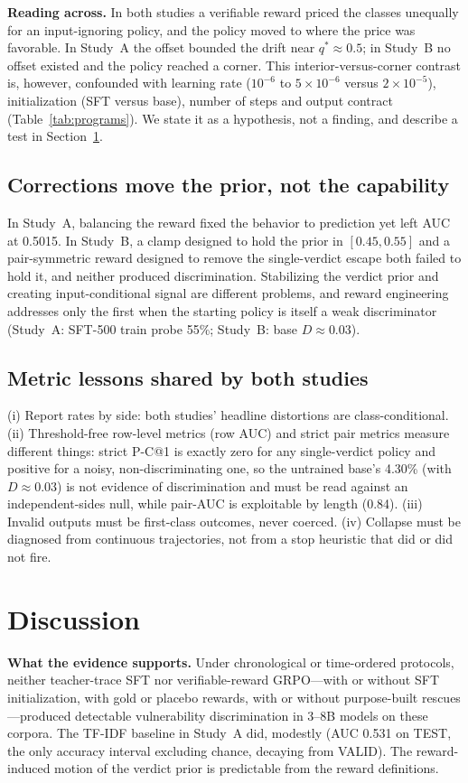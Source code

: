 \documentclass[journal]{IEEEtran}
\makeatletter
\newcommand{\pc}{P-C@1}
\makeatother
\begin{document}
\textbf{Reading across.} In both studies a verifiable reward priced the classes unequally for an input-ignoring policy, and the policy moved to where the price was favorable. In Study~A the offset bounded the drift near $q^*\approx0.5$; in Study~B no offset existed and the policy reached a corner. This interior-versus-corner contrast is, however, confounded with learning rate ($10^{-6}$ to $5{\times}10^{-6}$ versus $2{\times}10^{-5}$), initialization (SFT versus base), number of steps and output contract (Table~\ref{tab:programs}). We state it as a hypothesis, not a finding, and describe a test in Section~\ref{sec:discussion}.

\subsection{Corrections move the prior, not the capability}
In Study~A, balancing the reward fixed the behavior to prediction yet left AUC at 0.5015. In Study~B, a clamp designed to hold the prior in $[0.45,0.55]$ and a pair-symmetric reward designed to remove the single-verdict escape both failed to hold it, and neither produced discrimination. Stabilizing the verdict prior and creating input-conditional signal are different problems, and reward engineering addresses only the first when the starting policy is itself a weak discriminator (Study~A: SFT-500 train probe 55\%; Study~B: base $D\approx0.03$).

\subsection{Metric lessons shared by both studies}
(i) Report rates by side: both studies' headline distortions are class-conditional. (ii) Threshold-free row-level metrics (row AUC) and strict pair metrics measure different things: strict \pc{} is exactly zero for any single-verdict policy and positive for a noisy, non-discriminating one, so the untrained base's 4.30\% (with $D\approx0.03$) is not evidence of discrimination and must be read against an independent-sides null, while pair-AUC is exploitable by length (0.84). (iii) Invalid outputs must be first-class outcomes, never coerced. (iv) Collapse must be diagnosed from continuous trajectories, not from a stop heuristic that did or did not fire.

\section{Discussion}
\label{sec:discussion}
\textbf{What the evidence supports.} Under chronological or time-ordered protocols, neither teacher-trace SFT nor verifiable-reward GRPO---with or without SFT initialization, with gold or placebo rewards, with or without purpose-built rescues---produced detectable vulnerability discrimination in 3--8B models on these corpora. The TF-IDF baseline in Study~A did, modestly (AUC 0.531 on TEST, the only accuracy interval excluding chance, decaying from VALID). The reward-induced motion of the verdict prior is predictable from the reward definitions.
\end{document}
